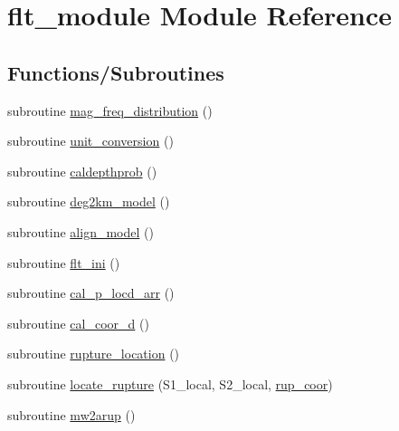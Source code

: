 \hypertarget{namespaceflt__module}{}\section{flt\+\_\+module Module Reference}
\label{namespaceflt__module}
\subsection*{Functions/\+Subroutines}
\begin{DoxyCompactItemize}
\item 
subroutine \hyperlink{namespaceflt__module_a36fbe983f26cb385897a0f3b3a69b374}{mag\+\_\+freq\+\_\+distribution} ()
\item 
subroutine \hyperlink{namespaceflt__module_adf3a48955b957b3900c168b85a7e3a7f}{unit\+\_\+conversion} ()
\item 
subroutine \hyperlink{namespaceflt__module_abdb1848f76f2f97490cbb813742463bb}{caldepthprob} ()
\item 
subroutine \hyperlink{namespaceflt__module_a7c28beda425cae19654ab1d770575fa9}{deg2km\+\_\+model} ()
\item 
subroutine \hyperlink{namespaceflt__module_a5fa0cac3fd11ee99069c21930a0e2fa4}{align\+\_\+model} ()
\item 
subroutine \hyperlink{namespaceflt__module_a70e82d6c4a8cbb15e934c5b846b3f2fd}{flt\+\_\+ini} ()
\item 
subroutine \hyperlink{namespaceflt__module_aea512cba753c29d842ade7e80af288dc}{cal\+\_\+p\+\_\+locd\+\_\+arr} ()
\item 
subroutine \hyperlink{namespaceflt__module_ae0fae05513f5a50898cdd23f18cee48e}{cal\+\_\+coor\+\_\+d} ()
\item 
subroutine \hyperlink{namespaceflt__module_a5e554053b0a794d5027652daae033cbb}{rupture\+\_\+location} ()
\item 
subroutine \hyperlink{namespaceflt__module_a4df7cbbee97b24416c4834d0da1d86f5}{locate\+\_\+rupture} (S1\+\_\+local, S2\+\_\+local, \hyperlink{namespaceflt__module_afbf76baeddad45d761cc805c838b369a}{rup\+\_\+coor})
\item 
subroutine \hyperlink{namespaceflt__module_a03121e683f2ec0d996e20de582b4a47c}{mw2arup} ()
\end{DoxyCompactItemize}
